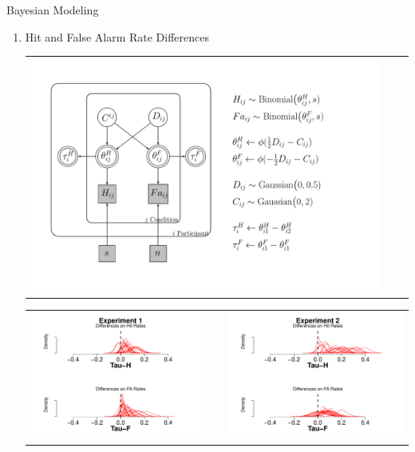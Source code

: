 \documentclass[final]{beamer}
\newlength{\onecolwid}
\newlength{\twocolwid}
\begin{document}
\begin{frame}[t]
\begin{columns}[t]
\begin{column}{\twocolwid}
\begin{columns}[t,totalwidth=\twocolwid]
\begin{column}{\onecolwid}
\begin{alertblock}{Bayesian Modeling}
\begin{enumerate}
$\qquad$


\item Hit and False Alarm Rate Differences
\begin{center}
\begin{tabular}{ccc}
\includegraphics[width=0.65\linewidth]{Figures/Tau_DiffTeta_Model3.pdf}
\end{tabular}


\begin{tabular}{ccc}
\includegraphics[width=0.48\linewidth]{Figures/Tau_1.pdf} & \hfill & \includegraphics[width=0.48\linewidth]{Figures/Tau_2.pdf}
\end{tabular}
\end{center}



$\quad$
\end{enumerate}


\end{alertblock}
\end{column}
\end{columns}
\end{column}
\end{columns}
\end{frame}
\end{document}
